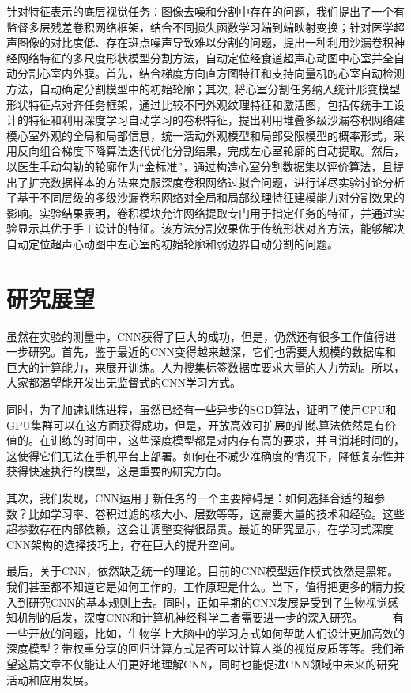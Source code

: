 针对特征表示的底层视觉任务：图像去噪和分割中存在的问题，我们提出了一个有监督多层残差卷积网络框架，结合不同损失函数学习端到端映射变换；针对医学超声图像的对比度低、存在斑点噪声导致难以分割的问题，提出一种利用沙漏卷积神经网络特征的多尺度形状模型分割方法，自动定位经食道超声心动图中心室并全自动分割心室内外膜。首先，结合梯度方向直方图特征和支持向量机的心室自动检测方法，自动确定分割模型中的初始轮廓；其次, 将心室分割任务纳入统计形变模型形状特征点对齐任务框架，通过比较不同外观纹理特征和激活图，包括传统手工设计的特征和利用深度学习自动学习的卷积特征，提出利用堆叠多级沙漏卷积网络建模心室外观的全局和局部信息，统一活动外观模型和局部受限模型的概率形式，采用反向组合梯度下降算法迭代优化分割结果，完成左心室轮廓的自动提取。然后，以医生手动勾勒的轮廓作为“金标准”，通过构造心室分割数据集以评价算法，且提出了扩充数据样本的方法来克服深度卷积网络过拟合问题，进行详尽实验讨论分析了基于不同层级的多级沙漏卷积网络对全局和局部纹理特征建模能力对分割效果的影响。实验结果表明，卷积模块允许网络提取专门用于指定任务的特征，并通过实验显示其优于手工设计的特征。该方法分割效果优于传统形状对齐方法，能够解决自动定位超声心动图中左心室的初始轮廓和弱边界自动分割的问题。

\section{研究展望}

虽然在实验的测量中，CNN获得了巨大的成功，但是，仍然还有很多工作值得进一步研究。首先，鉴于最近的CNN变得越来越深，它们也需要大规模的数据库和巨大的计算能力，来展开训练。人为搜集标签数据库要求大量的人力劳动。所以，大家都渴望能开发出无监督式的CNN学习方式。

同时，为了加速训练进程，虽然已经有一些异步的SGD算法，证明了使用CPU和GPU集群可以在这方面获得成功，但是，开放高效可扩展的训练算法依然是有价值的。在训练的时间中，这些深度模型都是对内存有高的要求，并且消耗时间的，这使得它们无法在手机平台上部署。如何在不减少准确度的情况下，降低复杂性并获得快速执行的模型，这是重要的研究方向。

其次，我们发现，CNN运用于新任务的一个主要障碍是：如何选择合适的超参数？比如学习率、卷积过滤的核大小、层数等等，这需要大量的技术和经验。这些超参数存在内部依赖，这会让调整变得很昂贵。最近的研究显示，在学习式深度CNN架构的选择技巧上，存在巨大的提升空间。

最后，关于CNN，依然缺乏统一的理论。目前的CNN模型运作模式依然是黑箱。我们甚至都不知道它是如何工作的，工作原理是什么。当下，值得把更多的精力投入到研究CNN的基本规则上去。同时，正如早期的CNN发展是受到了生物视觉感知机制的启发，深度CNN和计算机神经科学二者需要进一步的深入研究。
　　
有一些开放的问题，比如，生物学上大脑中的学习方式如何帮助人们设计更加高效的深度模型？带权重分享的回归计算方式是否可以计算人类的视觉皮质等等。我们希望这篇文章不仅能让人们更好地理解CNN，同时也能促进CNN领域中未来的研究活动和应用发展。